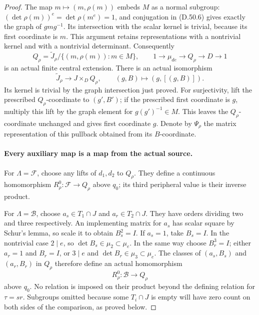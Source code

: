 \begin{proof}
The map
\(m\mapsto(m,\rho(m))\) embeds \(M\) as a normal subgroup:
\((\det\rho(m))^e=\det\rho(m^e)=1\), and conjugation in
\textup{(D.50.6)} gives exactly the graph of \(gmg^{-1}\).
Its intersection with the scalar kernel is trivial, because its
first coordinate is \(m\). This argument retains representations
with a nontrivial kernel and with a nontrivial determinant.
Consequently
\[
 Q_\rho=\widetilde J_\rho/\{(m,\rho(m)):m\in M\},
 \qquad
 1\longrightarrow\mu_{de}\longrightarrow Q_\rho
                \longrightarrow D\longrightarrow1
 \tag{D.50.7}
\]
is an actual finite central extension. There is an actual isomorphism
\[
 \widetilde J_\rho\longrightarrow J\times_D Q_\rho,
                \qquad (g,B)\longmapsto(g,[(g,B)]).
 \tag{D.50.8}
\]
Its kernel is trivial by the graph intersection just proved.
For surjectivity, lift the prescribed \(Q_\rho\)-coordinate to
\((g',B')\); if the prescribed first coordinate is \(g\), multiply
this lift by the graph element for \(g(g')^{-1}\in M\).
This leaves the \(Q_\rho\)-coordinate unchanged and gives first
coordinate \(g\). Denote by \(\Psi_\rho\) the matrix representation
of this pullback obtained from its \(B\)-coordinate.

\paragraph{Every auxiliary map is a map from the actual source.}
For \(\Lambda=\mathcal F\), choose any lifts of \(d_1,d_2\) to
\(Q_\rho\). They define a continuous homomorphism
\(R^0_\rho:\mathcal F\to Q_\rho\) above \(q_0\); its third
peripheral value is their inverse product.

For \(\Lambda=\mathcal B\), choose
\(a_s\in T_1\cap J\) and \(a_r\in T_2\cap J\).
They have orders dividing two and three respectively.
An implementing matrix for \(a_s\) has scalar square by Schur's
lemma, so scale it to obtain \(B_s^2=I\). If \(a_s=1\), take
\(B_s=I\). In the nontrivial case \(2\mid e\), so
\(\det B_s\in\mu_2\subset\mu_e\).
In the same way choose \(B_r^3=I\); either \(a_r=1\) and
\(B_r=I\), or \(3\mid e\) and \(\det B_r\in\mu_3\subset\mu_e\).
The classes of \((a_s,B_s)\) and \((a_r,B_r)\) in
\(Q_\rho\) therefore define an actual homomorphism
\[
                  R^0_\rho:\mathcal B\longrightarrow Q_\rho
 \tag{D.50.9}
\]
above \(q_0\). No relation is imposed on their product beyond
the defining relation for \(\tau=sr\).
Subgroups omitted because some \(T_i\cap J\) is empty will have
zero count on both sides of the comparison, as proved below.


\end{proof}

